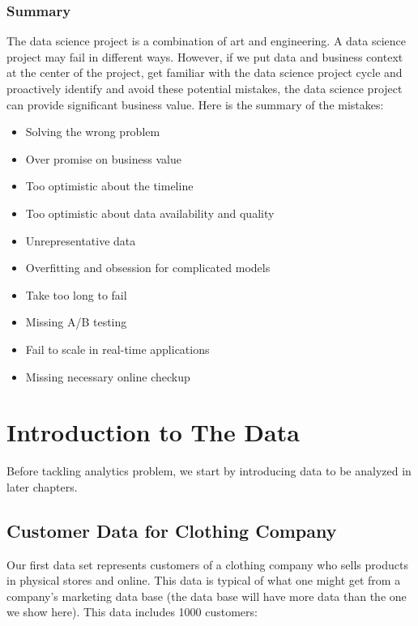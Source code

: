\documentclass[12pt,]{krantz}
\providecommand{\tightlist}{%
  \setlength{\itemsep}{0pt}\setlength{\parskip}{0pt}}
\begin{document}
\hypertarget{summary-1}{%
\subsection{Summary}\label{summary-1}}

The data science project is a combination of art and engineering. A data science project may fail in different ways. However, if we put data and business context at the center of the project, get familiar with the data science project cycle and proactively identify and avoid these potential mistakes, the data science project can provide significant business value. Here is the summary of the mistakes:

\begin{itemize}
\tightlist
\item
  Solving the wrong problem
\item
  Over promise on business value
\item
  Too optimistic about the timeline
\item
  Too optimistic about data availability and quality
\item
  Unrepresentative data
\item
  Overfitting and obsession for complicated models
\item
  Take too long to fail
\item
  Missing A/B testing
\item
  Fail to scale in real-time applications
\item
  Missing necessary online checkup
\end{itemize}

\hypertarget{introduction-to-the-data}{%
\chapter{Introduction to The Data}\label{introduction-to-the-data}}

Before tackling analytics problem, we start by introducing data to be analyzed in later chapters.

\hypertarget{customer-data-for-clothing-company}{%
\section{Customer Data for Clothing Company}\label{customer-data-for-clothing-company}}

Our first data set represents customers of a clothing company who sells products in physical stores and online. This data is typical of what one might get from a company's marketing data base (the data base will have more data than the one we show here). This data includes 1000 customers:
\end{document}
